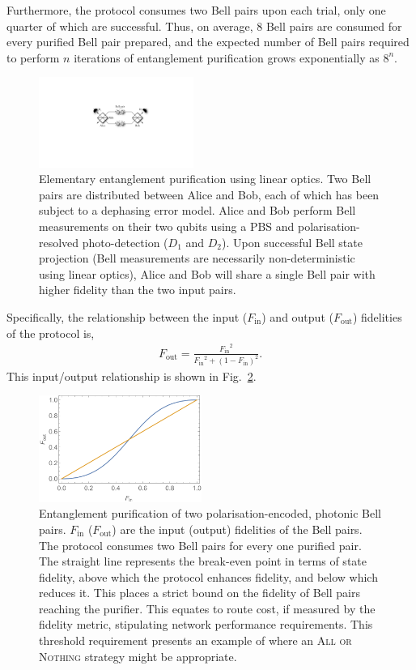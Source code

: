 Furthermore, the protocol consumes two Bell pairs upon each trial, only one quarter of which are successful. Thus, on average, 8 Bell pairs are consumed for every purified Bell pair prepared, and the expected number of Bell pairs required to perform $n$ iterations of entanglement purification grows exponentially as $8^n$.

\begin{figure}[!htbp]
\includegraphics[clip=true, width=0.45\textwidth]{ent_purif_prot}
\captionspacefig \caption{Elementary entanglement purification using linear optics. Two Bell pairs are distributed between Alice and Bob, each of which has been subject to a dephasing error model. Alice and Bob perform Bell measurements on their two qubits using a PBS and polarisation-resolved photo-detection ($D_1$ and $D_2$). Upon successful Bell state projection (Bell measurements are necessarily non-deterministic using linear optics), Alice and Bob will share a single Bell pair with higher fidelity than the two input pairs.} \label{fig:ent_purif_prot}
\end{figure}

Specifically, the relationship between the input ($F_\mathrm{in}$) and output ($F_\mathrm{out}$) fidelities of the protocol is,
\begin{align}
F_\mathrm{out} = \frac{{F_\mathrm{in}}^2}{{F_\mathrm{in}}^2 + (1-F_\mathrm{in})^2}.
\end{align}
This input/output relationship is shown in Fig.~\ref{fig:ent_purif}.

\begin{figure}[!htbp]
\includegraphics[clip=true, width=0.475\textwidth]{ent_purif}
\captionspacefig \caption{Entanglement purification of two polarisation-encoded, photonic Bell pairs. $F_\mathrm{in}$ ($F_\mathrm{out}$) are the input (output) fidelities of the Bell pairs. The protocol consumes two Bell pairs for every one purified pair. The straight line represents the break-even point in terms of state fidelity, above which the protocol enhances fidelity, and below which reduces it. This places a strict bound on the fidelity of Bell pairs reaching the purifier. This equates to route cost, if measured by the fidelity metric, stipulating network performance requirements. This threshold requirement presents an example of where an \textsc{All or Nothing} strategy might be appropriate.} \label{fig:ent_purif}
\end{figure}

